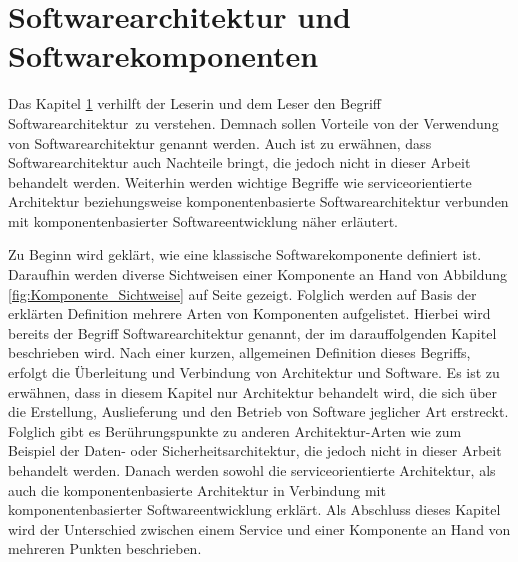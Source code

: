\section{Softwarearchitektur und Softwarekomponenten}
\label{sec:2_Architektur}
Das Kapitel \ref{sec:2_Architektur} verhilft der Leserin und dem Leser den Begriff \glqq Softwarearchitektur\grqq\ zu verstehen. Demnach sollen Vorteile von der Verwendung von Softwarearchitektur genannt werden. Auch ist zu erwähnen, dass Softwarearchitektur auch Nachteile bringt, die jedoch nicht in dieser Arbeit behandelt werden. Weiterhin werden wichtige Begriffe wie serviceorientierte Architektur beziehungsweise komponentenbasierte Softwarearchitektur verbunden mit komponentenbasierter Softwareentwicklung näher erläutert.

Zu Beginn wird geklärt, wie eine klassische Softwarekomponente definiert ist. Daraufhin werden diverse Sichtweisen einer Komponente an Hand von Abbildung \ref{fig:Komponente_Sichtweise} auf Seite \pageref{fig:Komponente_Sichtweise} gezeigt. Folglich werden auf Basis der erklärten Definition mehrere Arten von Komponenten aufgelistet. Hierbei wird bereits der Begriff Softwarearchitektur genannt, der im darauffolgenden Kapitel beschrieben wird. Nach einer kurzen, allgemeinen Definition dieses Begriffs, erfolgt die Überleitung und Verbindung von Architektur und Software. Es ist zu erwähnen, dass in diesem Kapitel nur Architektur behandelt wird, die sich über die Erstellung, Auslieferung und den Betrieb von Software jeglicher Art erstreckt. Folglich gibt es Berührungspunkte zu anderen Architektur-Arten wie zum Beispiel der Daten- oder Sicherheitsarchitektur, die jedoch nicht in dieser Arbeit behandelt werden.
Danach werden sowohl die serviceorientierte Architektur, als auch die komponentenbasierte Architektur in Verbindung mit komponentenbasierter Softwareentwicklung erklärt. Als Abschluss dieses Kapitel wird der Unterschied zwischen einem Service und einer Komponente an Hand von mehreren Punkten beschrieben.